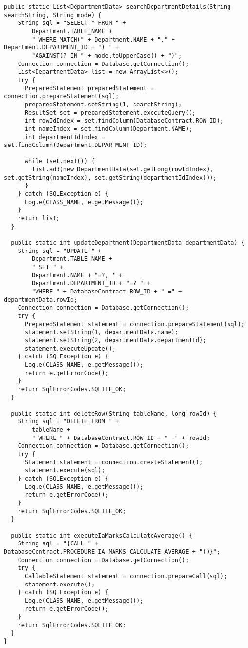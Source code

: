 \begin{lstlisting}[caption=DatabaseHelper.java]
  public static List<DepartmentData> searchDepartmentDetails(String searchString, String mode) {
    String sql = "SELECT * FROM " +
        Department.TABLE_NAME +
        " WHERE MATCH(" + Department.NAME + "," + Department.DEPARTMENT_ID + ") " +
        "AGAINST(? IN " + mode.toUpperCase() + ")";
    Connection connection = Database.getConnection();
    List<DepartmentData> list = new ArrayList<>();
    try {
      PreparedStatement preparedStatement = connection.prepareStatement(sql);
      preparedStatement.setString(1, searchString);
      ResultSet set = preparedStatement.executeQuery();
      int rowIdIndex = set.findColumn(DatabaseContract.ROW_ID);
      int nameIndex = set.findColumn(Department.NAME);
      int departmentIdIndex = set.findColumn(Department.DEPARTMENT_ID);

      while (set.next()) {
        list.add(new DepartmentData(set.getLong(rowIdIndex), set.getString(nameIndex), set.getString(departmentIdIndex)));
      }
    } catch (SQLException e) {
      Log.e(CLASS_NAME, e.getMessage());
    }
    return list;
  }

  public static int updateDepartment(DepartmentData departmentData) {
    String sql = "UPDATE " +
        Department.TABLE_NAME +
        " SET " +
        Department.NAME + "=?, " +
        Department.DEPARTMENT_ID + "=? " +
        "WHERE " + DatabaseContract.ROW_ID + " =" + departmentData.rowId;
    Connection connection = Database.getConnection();
    try {
      PreparedStatement statement = connection.prepareStatement(sql);
      statement.setString(1, departmentData.name);
      statement.setString(2, departmentData.departmentId);
      statement.executeUpdate();
    } catch (SQLException e) {
      Log.e(CLASS_NAME, e.getMessage());
      return e.getErrorCode();
    }
    return SqlErrorCodes.SQLITE_OK;
  }

  public static int deleteRow(String tableName, long rowId) {
    String sql = "DELETE FROM " +
        tableName +
        " WHERE " + DatabaseContract.ROW_ID + " =" + rowId;
    Connection connection = Database.getConnection();
    try {
      Statement statement = connection.createStatement();
      statement.execute(sql);
    } catch (SQLException e) {
      Log.e(CLASS_NAME, e.getMessage());
      return e.getErrorCode();
    }
    return SqlErrorCodes.SQLITE_OK;
  }

  public static int executeIaMarksCalculateAverage() {
    String sql = "{CALL " + DatabaseContract.PROCEDURE_IA_MARKS_CALCULATE_AVERAGE + "()}";
    Connection connection = Database.getConnection();
    try {
      CallableStatement statement = connection.prepareCall(sql);
      statement.execute();
    } catch (SQLException e) {
      Log.e(CLASS_NAME, e.getMessage());
      return e.getErrorCode();
    }
    return SqlErrorCodes.SQLITE_OK;
  }
}

\end{lstlisting}


